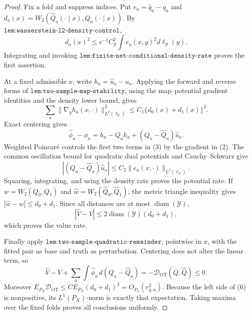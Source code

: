 \documentclass{article}
\begin{document}
\begin{proof}
Fix a fold and suppress indices. Put \(e_a=\widehat q_a-q_a\) and \(d_a(x)=W_2(\widehat Q_a(\cdot\mid x),Q_a(\cdot\mid x))\). By \(\texttt{lem:wasserstein-l2-density-control}\),
\[d_a(x)^2\le c^{-1}C_{\mathcal Y}^2\int e_a(x,y)^2d\ell_{\mathcal Y}(y).\tag{1}\]
Integrating and invoking \(\texttt{lem:finite-net-conditional-density-rate}\) proves the first assertion.

At a fixed admissible \(x\), write \(h_a=\widehat u_a-u_a\). Applying the forward and reverse forms of \(\texttt{lem:two-sample-map-stability}\), using the map--potential gradient identities and the density lower bound, gives
\[\sum_a\lVert\nabla_yh_a(x,\cdot)\rVert_{L^2(\ell_{\mathcal Y})}^2\le C_1\{d_0(x)+d_1(x)\}^2.\tag{2}\]
Exact centering gives
\[\widehat\phi_a-\phi_a=h_a-Q_ah_a+(Q_a-\widehat Q_a)\widehat u_a.\tag{3}\]
Weighted Poincar\'e controls the first two terms in (3) by the gradient in (2). The common oscillation bound for quadratic dual potentials and Cauchy--Schwarz give
\[|(Q_a-\widehat Q_a)\widehat u_a|\le C_2\lVert e_a(x,\cdot)\rVert_{L^2(\ell_{\mathcal Y})}.\tag{4}\]
Squaring, integrating, and using the density rate proves the potential rate. If \(w=W_2(Q_0,Q_1)\) and \(\widehat w=W_2(\widehat Q_0,\widehat Q_1)\), the metric triangle inequality gives \(|\widehat w-w|\le d_0+d_1\). Since all distances are at most \(\operatorname{diam}(\mathcal Y)\),
\[|\widehat V-V|\le2\operatorname{diam}(\mathcal Y)(d_0+d_1),\tag{5}\]
which proves the value rate.

Finally apply \(\texttt{lem:two-sample-quadratic-remainder}\), pointwise in \(x\), with the fitted pair as base and truth as perturbation. Centering does not alter the linear term, so
\[\widehat V-V+\sum_a\int\widehat\phi_a\,d(Q_a-\widehat Q_a)=-\mathscr D_{\mathrm{OT}}(Q,\widehat Q)\le0.\tag{6}\]
Moreover \(E_{P_X}\mathscr D_{\mathrm{OT}}\le C E_{P_X}(d_0+d_1)^2=O_{P_n}(r_{q,n}^2)\). Because the left side of (6) is nonpositive, its \(L^1(P_X)\)-norm is exactly that expectation. Taking maxima over the fixed folds proves all conclusions uniformly.
\end{proof}
\end{document}
